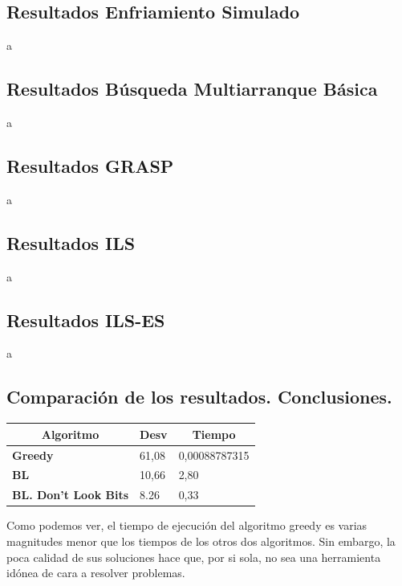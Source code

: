 \documentclass[a4paper, 12pt]{article}
\begin{document}
      \newpage
      \subsection{Resultados Enfriamiento Simulado}
      a
      
      \newpage
      \subsection{Resultados Búsqueda Multiarranque Básica}
      a
      
      \newpage
      \subsection{Resultados GRASP}
      a
      
      \newpage
      \subsection{Resultados ILS}
      a
      
      \newpage
      \subsection{Resultados ILS-ES}
      a
      
      \newpage
      \subsection{Comparación de los resultados. Conclusiones.}
\begin{table}[H]
\centering
\label{my-label}
\begin{tabular}{|l|l|l|}
\hline
\multicolumn{1}{|c|}{\textbf{Algoritmo}} & \textbf{Desv} & \multicolumn{1}{c|}{\textbf{Tiempo}} \\ \hline
\textbf{Greedy}                          & 61,08         & 0,00088787315                        \\ \hline
\textbf{BL}                              & 10,66         & 2,80                                 \\ \hline
\textbf{BL. Don't Look Bits}             & 8.26          & 0,33                                 \\ \hline
\end{tabular}
\end{table}
      
      Como podemos ver, el tiempo de ejecución del algoritmo greedy es varias magnitudes menor que los tiempos de los otros dos algoritmos. Sin embargo, la poca calidad de sus soluciones hace que, por si sola, no sea una herramienta idónea de cara a resolver problemas.\\
      
\end{document}
